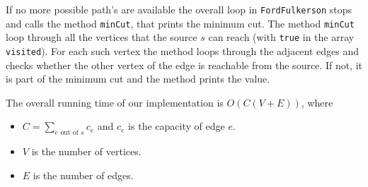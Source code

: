 \documentclass{tufte-handout}
\begin{document}
If no more possible path's are available the overall loop in \verb#FordFulkerson# stops and calls the method \verb#minCut#, that prints the minimum cut. The method \verb#minCut# loop through all the vertices that the source $s$ can reach (with \verb#true# in the array \verb#visited#). For each such vertex the method loops through the adjacent edges and checks whether the other vertex of the edge is reachable from the source. If not, it is part of the minimum cut and the method prints the value.

The overall running time of our implementation is $O(C(V+E))$, where 
\begin{itemize}[-]
\item $C = \sum_{e\text{ out of }s} c_e$ and $c_e$ is the capacity of edge $e$.
\item $V$ is the number of vertices.
\item $E$ is the number of edges.
\end{itemize}
\end{document}
